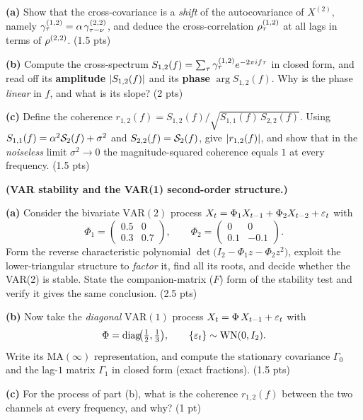 \documentclass[11pt]{article}
\DeclareMathOperator{\diag}{diag}
\begin{document}
\textbf{(a)} Show that the cross-covariance is a \emph{shift} of the autocovariance of $X^{(2)}$, namely $\gamma_\tau^{(1,2)}=\alpha\,\gamma_{\tau-\nu}^{(2,2)}$, and deduce the cross-correlation $\rho_\tau^{(1,2)}$ at all lags in terms of $\rho^{(2,2)}$. \hfill(1.5 pts)

\textbf{(b)} Compute the cross-spectrum $S_{1,2}(f)=\sum_\tau\gamma_\tau^{(1,2)}e^{-2\pi if\tau}$ in closed form, and read off its \textbf{amplitude} $\left\lvert S_{1,2}(f) \right\rvert$ and its \textbf{phase} $\arg S_{1,2}(f)$. Why is the phase \emph{linear} in $f$, and what is its slope? \hfill(2 pts)

\textbf{(c)} Define the coherence $r_{1,2}(f)=S_{1,2}(f)/\sqrt{S_{1,1}(f)\,S_{2,2}(f)}$. Using $S_{1,1}(f)=\alpha^2\mathcal{S}_2(f)+\sigma^2$ and $S_{2,2}(f)=\mathcal{S}_2(f)$, give $\left\lvert r_{1,2}(f) \right\rvert$, and show that in the \emph{noiseless} limit $\sigma^2\to0$ the magnitude-squared coherence equals $1$ at every frequency. \hfill(1.5 pts)
\answerpage

\textbf{(VAR stability and the VAR(1) second-order structure.)}

\textbf{(a)} Consider the bivariate $\mathrm{VAR}(2)$ process $X_t=\Phi_1X_{t-1}+\Phi_2X_{t-2}+\varepsilon_t$ with
\[
\Phi_1=\begin{pmatrix}0.5 & 0\\[2pt] 0.3 & 0.7\end{pmatrix},\qquad
\Phi_2=\begin{pmatrix}0 & 0\\[2pt] 0.1 & -0.1\end{pmatrix}.
\]
Form the reverse characteristic polynomial $\det\bigl(I_2-\Phi_1 z-\Phi_2 z^2\bigr)$, exploit the lower-triangular structure to \emph{factor} it, find all its roots, and decide whether the VAR(2) is stable. State the companion-matrix ($F$) form of the stability test and verify it gives the same conclusion. \hfill(2.5 pts)

\textbf{(b)} Now take the \emph{diagonal} $\mathrm{VAR}(1)$ process $X_t=\Phi\,X_{t-1}+\varepsilon_t$ with
\[
\Phi=\diag\!\bigl(\tfrac12,\tfrac13\bigr),\qquad
\{\eps_t\}\sim\mathrm{WN}(0,I_2).
\]
Write its $\mathrm{MA}(\infty)$ representation, and compute the stationary covariance $\Gamma_0$ and the lag-$1$ matrix $\Gamma_1$ in closed form (exact fractions). \hfill(1.5 pts)

\textbf{(c)} For the process of part (b), what is the coherence $r_{1,2}(f)$ between the two channels at every frequency, and why? \hfill(1 pt)
\answerpage
\end{document}
